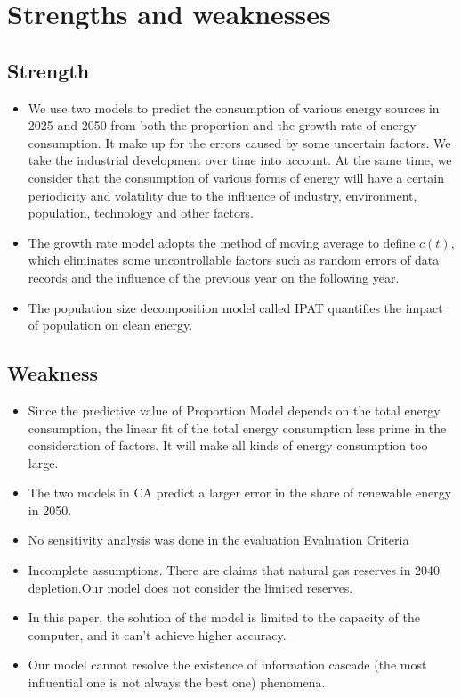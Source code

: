 \documentclass{mcmthesis}
\begin{document}
\section{Strengths and weaknesses}
\subsection{Strength}
\begin{itemize}
	\item We use two models to predict the consumption of various energy sources in 2025 and 2050 from both the proportion and the growth rate of energy consumption. It  make up for the errors caused by some uncertain factors. We take the industrial development over time into account. At the same time, we consider that the consumption of various forms of energy will have a certain periodicity and volatility due to the influence of industry, environment, population, technology and other factors.
	\item The growth rate model adopts the method of moving average to define $ c(t) $, which eliminates some uncontrollable factors such as random errors of data records and the influence of the previous year on the following year.
	\item The population size decomposition model called IPAT quantifies the impact of population on clean energy.
\end{itemize}
\subsection{Weakness}
\begin{itemize}
	\item Since the predictive value of Proportion Model depends on the total energy consumption, the linear fit of the total energy consumption less prime in the consideration of factors. It will make all kinds of energy consumption too large.	
	\item The two models in CA predict a larger error in the share of renewable energy in 2050.
	\item No sensitivity analysis was done in the evaluation Evaluation Criteria 
	\item Incomplete assumptions. There are claims that natural gas reserves in 2040 depletion.Our model does not consider the limited reserves.
	\item In this paper, the solution of the model is limited to the capacity of the computer, and it can't achieve higher accuracy.
	\item Our model cannot resolve the existence of information cascade (the most influential one is not always the best one) phenomena.
\end{itemize}
\end{document}
